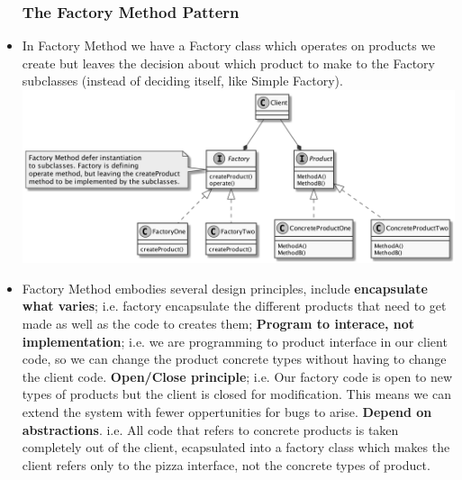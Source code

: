 \documentclass[11pt]{article}
\begin{document}
\begin{itemize}
        \subsubsection{The Factory Method Pattern}
        \item In Factory Method we have a Factory class which operates on products we create but leaves the decision about
        which product to make to the Factory subclasses (instead of deciding itself, like Simple Factory).\\
        \includegraphics[scale=0.2]{factories/5__factory_method_pattern_general}
        \item Factory Method embodies several design principles, include \textbf{encapsulate what varies}; i.e. factory encapsulate
        the different products that need to get made as well as the code to creates them; \textbf{Program to interace, not implementation};
        i.e. we are programming to product interface in our client code, so we can change the product concrete types without
        having to change the client code. \textbf{Open/Close principle}; i.e. Our factory code is open to new types of products but
        the client is closed for modification. This means we can extend the system with fewer oppertunities for bugs to arise.
        \textbf{Depend on abstractions}. i.e. All code that refers to concrete products is taken completely out of the client, ecapsulated
        into a factory class which makes the client refers only to the pizza interface, not the concrete types of product.
    \end{itemize}
\end{document}
